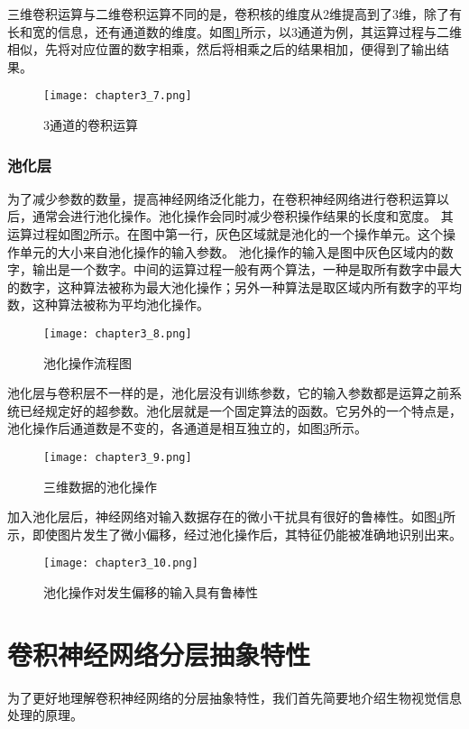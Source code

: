 三维卷积运算与二维卷积运算不同的是，卷积核的维度从2维提高到了3维，除了有长和宽的信息，还有通道数的维度。如图\ref{fig:chapter3_7}所示，以3通道为例，其运算过程与二维相似，先将对应位置的数字相乘，然后将相乘之后的结果相加，便得到了输出结果。
\begin{figure}
    \centering
    \texttt{[image: chapter3\_7.png]}
    \caption{3通道的卷积运算}
    \label{fig:chapter3_7}
\end{figure}
\subsubsection{池化层}
为了减少参数的数量，提高神经网络泛化能力，在卷积神经网络进行卷积运算以后，通常会进行池化操作。池化操作会同时减少卷积操作结果的长度和宽度。
其运算过程如图\ref{fig:chapter3_8}所示。在图中第一行，灰色区域就是池化的一个操作单元。这个操作单元的大小来自池化操作的输入参数。
池化操作的输入是图中灰色区域内的数字，输出是一个数字。中间的运算过程一般有两个算法，一种是取所有数字中最大的数字，这种算法被称为最大池化操作；另外一种算法是取区域内所有数字的平均数，这种算法被称为平均池化操作。
\begin{figure}
    \centering
    \texttt{[image: chapter3\_8.png]}
    \caption{池化操作流程图}
    \label{fig:chapter3_8}
\end{figure}

池化层与卷积层不一样的是，池化层没有训练参数，它的输入参数都是运算之前系统已经规定好的超参数。池化层就是一个固定算法的函数。它另外的一个特点是，池化操作后通道数是不变的，各通道是相互独立的，如图\ref{fig:chapter3_9}所示。
\begin{figure}
    \centering
    \texttt{[image: chapter3\_9.png]}
    \caption{三维数据的池化操作}
    \label{fig:chapter3_9}
\end{figure}

加入池化层后，神经网络对输入数据存在的微小干扰具有很好的鲁棒性。如图\ref{fig:chapter3_10}所示，即使图片发生了微小偏移，经过池化操作后，其特征仍能被准确地识别出来。
\begin{figure}
    \centering
    \texttt{[image: chapter3\_10.png]}
    \caption{池化操作对发生偏移的输入具有鲁棒性}
    \label{fig:chapter3_10}
\end{figure}

\section{卷积神经网络分层抽象特性}
为了更好地理解卷积神经网络的分层抽象特性，我们首先简要地介绍生物视觉信息处理的原理。
